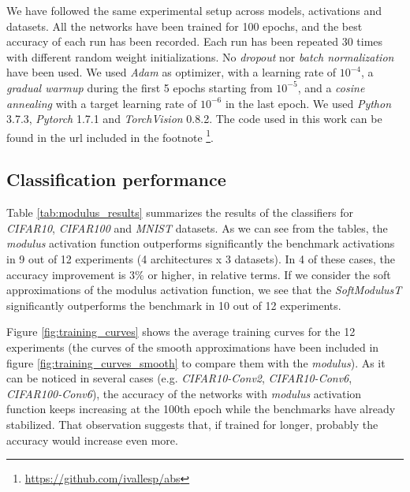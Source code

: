 We have followed the same experimental setup across models, activations and datasets. All the networks have been trained for 100 epochs, and the best accuracy of each run has been recorded. Each run has been repeated 30 times with different random weight initializations. No \textit{dropout} \autocite{srivastava2014} nor \textit{batch normalization} \autocite{ioffe2015} have been used. We used \textit{Adam} \autocite{kingma14} as optimizer, with a learning rate of $10^{-4}$, a \textit{gradual warmup} \autocite{gotmare2018} during the first 5 epochs starting from $10^{-5}$, and a \textit{cosine annealing} \autocite{loshchilov2017} with a target learning rate of $10^{-6}$ in the last epoch. We used \textit{Python} 3.7.3, \textit{Pytorch} 1.7.1 and  \textit{TorchVision} 0.8.2. The code used in this work can be found in the url included in the footnote \footnote{\url{https://github.com/ivallesp/abs}}.


\subsection{Classification performance}
Table \ref{tab:modulus_results} summarizes the results of the classifiers for \textit{CIFAR10}, \textit{CIFAR100} and \textit{MNIST} datasets. As we can see from the tables, the \textit{modulus} activation function outperforms significantly the benchmark activations in 9 out of 12 experiments (4 architectures x 3 datasets). In 4 of these cases, the accuracy improvement is $3\%$ or higher, in relative terms. If we consider the soft approximations of the modulus activation function, we see that the \textit{SoftModulusT} significantly outperforms the benchmark in 10 out of 12 experiments.

Figure \ref{fig:training_curves} shows the average training curves for the 12 experiments (the curves of the smooth approximations have been included in figure \ref{fig:training_curves_smooth} to compare them with the \textit{modulus}). As it can be noticed in several cases (e.g. \textit{CIFAR10-Conv2}, \textit{CIFAR10-Conv6}, \textit{CIFAR100-Conv6}), the accuracy of the networks with \textit{modulus} activation function keeps increasing at the 100th epoch while the benchmarks have already stabilized. That observation suggests that, if trained for longer, probably the accuracy would increase even more.


